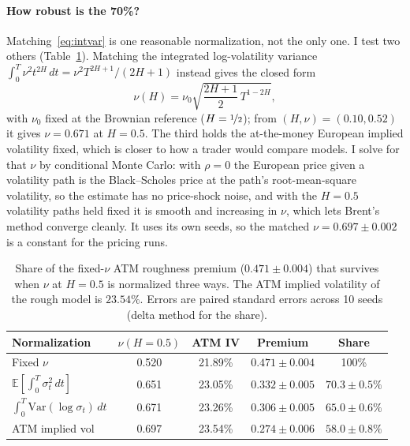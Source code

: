 \paragraph{How robust is the 70\%? }
Matching~\eqref{eq:intvar} is one reasonable normalization, not the only one.  I test
two others (Table~\ref{tab:roughshare}).  Matching the integrated log-volatility
variance $\int_0^T \nu^2 t^{2H}\,dt = \nu^2 T^{2H+1}/(2H+1)$ instead gives the closed
form
\begin{equation}
  \nu(H) = \nu_0\sqrt{\frac{2H+1}{2}\,T^{1-2H}},
\end{equation}
with $\nu_0$ fixed at the Brownian reference ($H = \nicefrac{1}{2}$); from
$(H, \nu) = (0.10, 0.52)$ it gives $\nu = 0.671$ at $H = 0.5$.  The third holds the
at-the-money European implied volatility fixed, which is closer to how a trader would
compare models.  I solve for that $\nu$ by conditional Monte Carlo: with $\rho = 0$ the
European price given a volatility path is the Black--Scholes price at the path's
root-mean-square volatility, so the estimate has no price-shock noise, and with the
$H = 0.5$ volatility paths held fixed it is smooth and increasing in $\nu$, which lets
Brent's method converge cleanly.  It uses its own seeds, so the matched
$\nu = 0.697 \pm 0.002$ is a constant for the pricing runs.

\begin{table}[t]
  \caption{Share of the fixed-$\nu$ ATM roughness premium ($0.471 \pm 0.004$) that
    survives when $\nu$ at $H = 0.5$ is normalized three ways.  The ATM implied
    volatility of the rough model is $23.54\%$.  Errors are paired standard errors
    across 10 seeds (delta method for the share).}
  \label{tab:roughshare}
  \centering
  \small
  \begin{tabular}{lcccc}
    \toprule
    Normalization & $\nu(H{=}0.5)$ & ATM IV & Premium & Share \\
    \midrule
    Fixed $\nu$ & 0.520 & 21.89\% & $0.471 \pm 0.004$ & 100\% \\
    $\mathbb{E}[\int_0^T \sigma_t^2\,dt]$ & 0.651 & 23.05\% & $0.332 \pm 0.005$ & $70.3 \pm 0.5\%$ \\
    $\int_0^T \text{Var}(\log\sigma_t)\,dt$ & 0.671 & 23.26\% & $0.306 \pm 0.005$ & $65.0 \pm 0.6\%$ \\
    ATM implied vol & 0.697 & 23.54\% & $0.274 \pm 0.006$ & $58.0 \pm 0.8\%$ \\
    \bottomrule
  \end{tabular}
\end{table}

